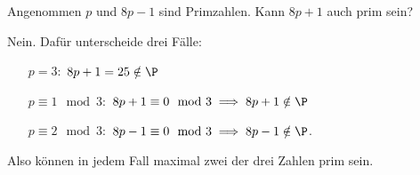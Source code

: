 
\begin{exercise}

Angenommen $p$ und $8p - 1$ sind Primzahlen. Kann $8p + 1$ auch prim sein?

\end{exercise}


\begin{solution}

Nein. Dafür unterscheide drei Fälle:

\begin{itemize}
    \item[$p = 3:$] $8p + 1 = 25 \notin \P$
    \item[$p \equiv 1 \mod{3}:$] $8p + 1 \equiv 0 \mod{3} \implies 8p + 1 \notin \P$
    \item[$p \equiv 2 \mod{3}:$] $8p - 1 \equiv 0 \mod{3} \implies 8p - 1 \notin \P$.
\end{itemize}

Also können in jedem Fall maximal zwei der drei Zahlen prim sein.
\end{solution}

